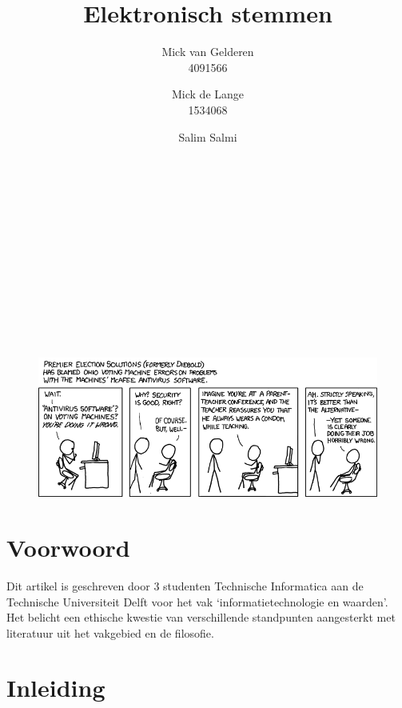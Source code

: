 \documentclass[a4paper]{article}
\title{Elektronisch stemmen}
\author{
Mick van Gelderen \\ 4091566 \and 
Mick de Lange \\ 1534068 \and
Salim Salmi \\ \TODO{stdnr}
}
\begin{document}
\thispagestyle{plain}
\maketitle

\hfill \\ \\ \\ \\ \\ \\ \\ \\ \\ \\
\begin{figure}[htp]
\centering
\includegraphics[width=\textwidth]{media/voting_machines.png}
\label{fig:voting-machines}

\end{figure}

\newpage

\thispagestyle{plain}

\section*{Voorwoord}
Dit artikel is geschreven door 3 studenten Technische Informatica aan de Technische Universiteit Delft voor het vak `informatietechnologie en waarden'. Het belicht een ethische kwestie van verschillende standpunten aangesterkt met literatuur uit het vakgebied en de filosofie. 

\newpage

\thispagestyle{plain}
\renewcommand{\contentsname}{Inhoud} 
\tableofcontents

\newpage

\section{Inleiding}
\end{document}
